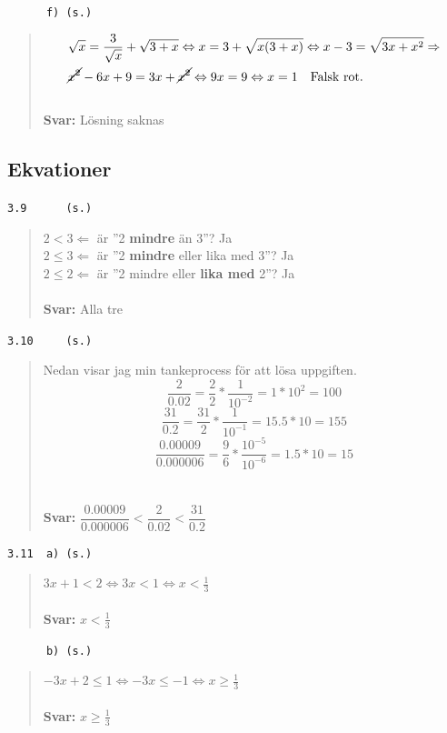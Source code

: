 \documentclass[a4paper]{article}
\newcommand{\tskcol}[1]{\textcolor{tskcol}{#1}}
\begin{document}
	\texttt{\tskcol{~~~~~~f) (s.)}}
	\begin{quotation}
		\noindent
		\begin{align*}
		&\sqrt{x}=\dfrac{3}{\sqrt{x}}+\sqrt{3+x} \Leftrightarrow
		x=3+\sqrt{x(3+x)} \Leftrightarrow
		x-3=\sqrt{3x+x^2} \Rightarrow \\
		&\cancel{x^2}-6x+9=3x+\cancel{x^2} \Leftrightarrow
		9x=9 \Leftrightarrow
		x=1 \text{~~~Falsk rot.}
		\end{align*}
		\\
		\textbf{Svar:} Lösning saknas
	\end{quotation}
	
	\subsection*{Ekvationer}
	
	\texttt{\tskcol{3.9~~~~~ (s.)}}
	\begin{quotation}
		\noindent
		$2<3 \Leftarrow$ är ''2 \textbf{mindre} än 3''? Ja \\
		$2 \le 3 \Leftarrow$ är ''2 \textbf{mindre} eller lika med 3''? Ja \\
		$2 \le 2 \Leftarrow$ är ''2 mindre eller \textbf{lika med} 2''? Ja 
		\\ \\
		\textbf{Svar:} Alla tre
	\end{quotation}
	
	\texttt{\tskcol{3.10~~~~ (s.)}}
	\begin{quotation}
		\noindent
		Nedan visar jag min tankeprocess för att lösa uppgiften.
		\[\frac{2}{0.02}=
		\frac{2}{2}*\frac{1}{10^{-2}}=
		1*10^2=
		100\]
		\[\frac{31}{0.2}=
		\frac{31}{2}*\frac{1}{10^{-1}}=
		15.5*10=
		155\]
		\[\frac{0.00009}{0.000006}=
		\frac{9}{6}*\frac{10^{-5}}{10^{-6}}=
		1.5*10=
		15\]
		\\ \\
		\textbf{Svar:} $\dfrac{0.00009}{0.000006}<\dfrac{2}{0.02}<\dfrac{31}{0.2}$
	\end{quotation}
	
	\texttt{\tskcol{3.11~~a) (s.)}}
	\begin{quotation}
		\noindent
		$3x+1<2 \Leftrightarrow
		3x<1 \Leftrightarrow
		x<\frac{1}{3}$
		\\ \\
		\textbf{Svar:} $x<\frac{1}{3}$
	\end{quotation}
	
	\texttt{\tskcol{~~~~~~b) (s.)}}
	\begin{quotation}
		\noindent
		$-3x+2\le1 \Leftrightarrow
		-3x\le-1 \Leftrightarrow
		x\ge\frac{1}{3}$
		\\ \\
		\textbf{Svar:} $x\ge\frac{1}{3}$
	\end{quotation}
	
\end{document}
